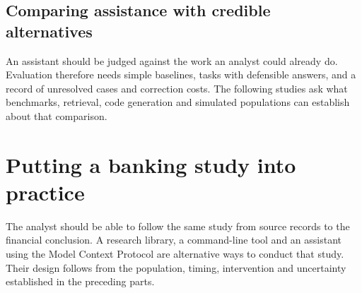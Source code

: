 \documentclass[11pt,a4paper,openany]{book}
\begin{document}


















\chapter{Comparing assistance with credible alternatives}
An assistant should be judged against the work an analyst could already
do. Evaluation therefore needs simple baselines, tasks with defensible answers,
and a record of unresolved cases and correction costs. The following studies
ask what benchmarks, retrieval, code generation and simulated populations can
establish about that comparison.













\part{Putting a banking study into practice}
\label{reading:part-practice}
The analyst should be able to follow the same study from source records
to the financial conclusion. A research library, a command-line tool and an
assistant using the Model Context Protocol are alternative ways to conduct that
study. Their design follows from the population, timing, intervention and
uncertainty established in the preceding parts.
\end{document}
